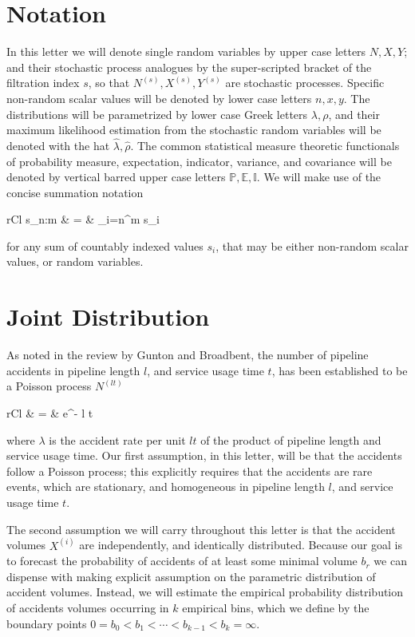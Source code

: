 \documentclass[letterpaper,10pt,oneside,final,onecolumn]{article}
\begin{document}
	\section{Notation}\label{notation}
	In this letter we will denote single random variables by upper case letters $N, X, Y$; and their stochastic process analogues by the super-scripted bracket of the filtration index $s$, so that $N^{\left(s\right)}, X^{\left(s\right)}, Y^{\left(s\right)}$ are stochastic processes.
	Specific non-random scalar values will be denoted by lower case letters $n, x, y$.
	The distributions will be parametrized by lower case Greek letters $\lambda, \rho$, and their maximum likelihood estimation from the stochastic random variables will be denoted with the hat $\hat{\lambda}, \hat{\rho}$. 
	The common statistical measure theoretic functionals of probability measure, expectation, indicator, variance, and covariance will be denoted by vertical barred upper case letters $\mathbb{P}, \mathbb{E}, \mathbb{I}$.
	We will make use of the concise summation notation 
	\begin{IEEEeqnarray*}{rCl}
		s_{n:m} & = & \sum_{i=n}^m s_i
	\end{IEEEeqnarray*}
	for any sum of countably indexed values $s_i$, that may be either non-random scalar values, or random variables.

	\section{Joint Distribution}\label{joint-distribution}
	As noted in the review by Gunton and Broadbent, the number of pipeline accidents in pipeline length $l$, and service usage time $t$, has been established to be a Poisson process $N^{\left(lt\right)}$
	\begin{IEEEeqnarray*}{rCl}
		 \left[N^{\left(lt\right)} = n \right]
			& = &  e^{- l t \lambda}
	\end{IEEEeqnarray*}
	where $\lambda$ is the accident rate per unit $lt$ of the product of pipeline length and service usage time.
	Our first assumption, in this letter, will be that the accidents follow a Poisson process; this explicitly requires that the accidents are rare events, which are stationary, and homogeneous in pipeline length $l$, and service usage time $t$.

	The second assumption we will carry throughout this letter is that the accident volumes $X^{\left(i\right)}$ are independently, and identically distributed.
	Because our goal is to forecast the probability of accidents of at least some minimal volume $b_r$ we can dispense with making explicit assumption on the parametric distribution of accident volumes.
	Instead, we will estimate the empirical probability distribution of accidents volumes occurring in $k$ empirical bins, which we define by the boundary points $0 = b_0 < b_1 < \cdots < b_{k-1} < b_k = \infty$.
	
\end{document}
